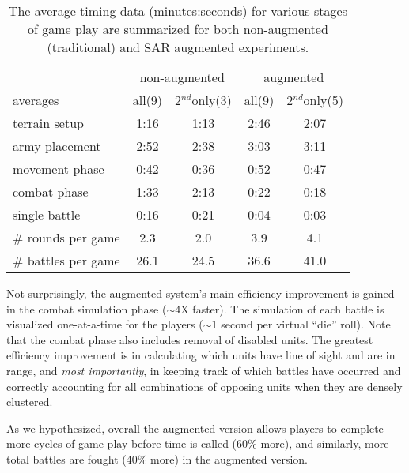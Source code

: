 \begin{table}[tb]
\begin{center}
\begin{tabular}{@{}l|cc|cc@{}}
               & \multicolumn{2}{c|}{\small non-augmented} & \multicolumn{2}{c}{\small augmented} \\
\small averages       & \small all(9) & \small 2$^{nd}$only(3) & \small all(9) & \small 2$^{nd}$only(5) \\ \hline
\small terrain setup  & \small 1:16    & \small 1:13         & \small 2:46    & \small 2:07         \\
\small army placement & \small 2:52    & \small 2:38         & \small 3:03    & \small 3:11 \\ 
\small movement phase & \small 0:42    & \small 0:36         & \small 0:52    & \small 0:47 \\
\small combat phase   & \small 1:33    & \small 2:13         & \small 0:22    & \small 0:18 \\
\small single battle  & \small 0:16    & \small 0:21         & \small 0:04    & \small 0:03 \\ \hline
\small \# rounds per game & \small 2.3  & \small 2.0         & \small 3.9     & \small 4.1 \\
\small \# battles per game & \small 26.1   & \small 24.5   & \small  36.6    & \small 41.0 
\end{tabular}
\end{center}%
\vspace{-0.05in}
\caption{ The average timing data (minutes:seconds) for various stages
  of game play are summarized for both non-augmented (traditional) and
  SAR augmented experiments.
\label{table:timing_stats}
}
\vspace{-0.1in}
\end{table}

Not-surprisingly, the augmented system's main efficiency improvement
is gained in the combat simulation phase ($\sim$4X faster).  The
simulation of each battle is visualized one-at-a-time for the players
($\sim$1 second per virtual ``die'' roll).  Note that the combat phase
also includes removal of disabled units.
The greatest efficiency improvement is in calculating which units have
line of sight and are in range, and {\em most importantly}, in keeping
track of which battles have occurred and correctly accounting for all
combinations of opposing units when they are densely clustered.

As we hypothesized, overall the augmented version allows players to
complete more cycles of game play before time is called (60\% more),
and similarly, more total battles are fought (40\% more) in the
augmented version.

